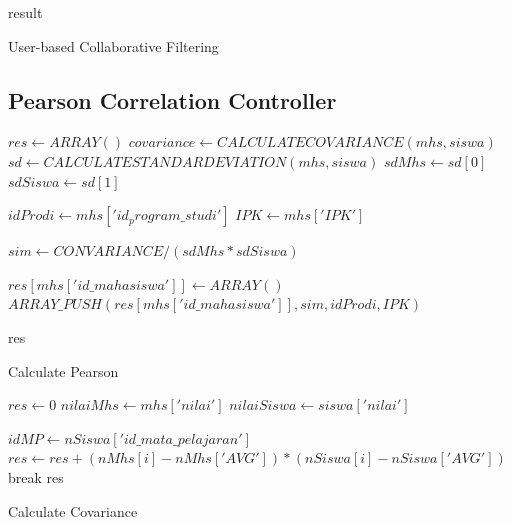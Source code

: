 \begin{algorithm}[H]
  \begin{algorithmic}[1]
        \State \Return result
    \EndProcedure
  \end{algorithmic} 
  \caption{User-based Collaborative Filtering}
  \label{alg:getResult user-based}
\end{algorithm}

\subsection{Pearson Correlation Controller}
\label{subsec:pearson}

\begin{algorithm}[H]
  \begin{algorithmic}[1]
        \State $res \gets ARRAY()$
            \State $covariance \gets CALCULATECOVARIANCE(mhs, siswa)$
            \State $sd \gets CALCULATESTANDARDEVIATION(mhs,siswa)$
            \State $sdMhs \gets sd[0]$
            \State $sdSiswa \gets sd[1]$
            
            \State $idProdi \gets mhs['id_program\_studi']$
            \State $IPK \gets mhs['IPK']$
            
            \State $sim \gets CONVARIANCE / (sdMhs * sdSiswa)$
            
                \State $res[mhs['id\_mahasiswa']] \gets ARRAY()$
                \State $ARRAY\_PUSH(res[mhs['id\_mahasiswa']], sim, idProdi, IPK)$
            \EndIf
        \EndFor
    
        \State \Return res
    \EndProcedure
  \end{algorithmic} 
  \caption{Calculate Pearson}
  \label{alg:calculatePearson}
\end{algorithm}

\begin{algorithm}[H]
  \begin{algorithmic}[1]
        \State $res \gets 0$
        \State $nilaiMhs \gets mhs['nilai']$
        \State $nilaiSiswa \gets siswa['nilai']$
        
            \State $idMP \gets nSiswa['id\_mata\_pelajaran']$
                        \State $res \gets res +  (nMhs[i]-nMhs['AVG'])*(nSiswa[i]-nSiswa['AVG'])$
                    \EndFor
                    \State break
                \EndIf
            \EndFor
        \EndFor
        \State \Return res
    \EndProcedure
  \end{algorithmic} 
  \caption{Calculate Covariance}
  \label{alg:calculateCovariance}
\end{algorithm}

